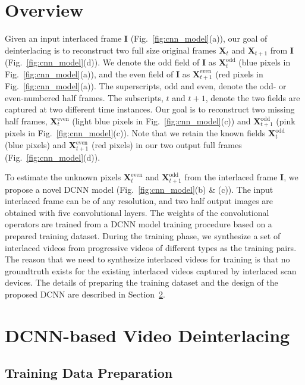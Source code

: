 \documentclass[acmtog]{acmart}
\begin{document}
\section{Overview}
Given an input interlaced frame $\mathbf{I}$ (Fig.~\ref{fig:cnn_model}(a)),  our
goal of deinterlacing is to reconstruct two full size original frames
$\mathbf{X}_t$ and $\mathbf{X}_{t+1}$ from $\mathbf{I}$
(Fig.~\ref{fig:cnn_model}(d)). We denote the odd field of $\mathbf{I}$ as
$\mathbf{X}^{\text{odd}}_t$ (blue pixels in Fig.~\ref{fig:cnn_model}(a)), and
the even field of $\mathbf{I}$ as $\mathbf{X}^{\text{even}}_{t+1}$ (red pixels in
Fig.~\ref{fig:cnn_model}(a)). The superscripts, $\text{odd}$ and $\text{even}$,
denote the odd- or even-numbered half frames. The subscripts, $t$ and $t+1$,
denote the two fields are captured at two different time instances. Our goal is
to reconstruct two missing half frames, $\mathbf{X}^{\text{even}}_t$ (light blue
pixels in Fig.~\ref{fig:cnn_model}(c)) and $\mathbf{X}^{\text{odd}}_{t+1}$ (pink
pixels in Fig.~\ref{fig:cnn_model}(c)). Note that we retain the known fields
$\mathbf{X}^{\text{odd}}_t$  (blue pixels) and $\mathbf{X}^{\text{even}}_{t+1}$
(red pixels) in our two output full frames (Fig.~\ref{fig:cnn_model}(d)).

To estimate the unknown pixels $\mathbf{X}^{\text{even}}_t$ and
$\mathbf{X}^{\text{odd}}_{t+1}$ from the interlaced frame $\mathbf{I}$, we
propose a novel DCNN model (Fig.~\ref{fig:cnn_model}(b) \& (c)). The input
interlaced frame can be of any resolution, and two half output images are
obtained with five convolutional layers. The weights of the convolutional
operators are trained from a DCNN model training procedure based on a prepared
training dataset. During the training phase, we synthesize a set of interlaced
videos from progressive videos of different types as the training pairs. The
reason that we need to synthesize interlaced videos for training is that no
groundtruth exists for the existing interlaced videos captured by interlaced
scan devices. The details of preparing the training dataset and the design
of the proposed DCNN are described in Section~\ref{sec:deinterlacing}. 
\section{DCNN-based Video Deinterlacing}\label{sec:deinterlacing}
\subsection{Training Data Preparation}
\end{document}
